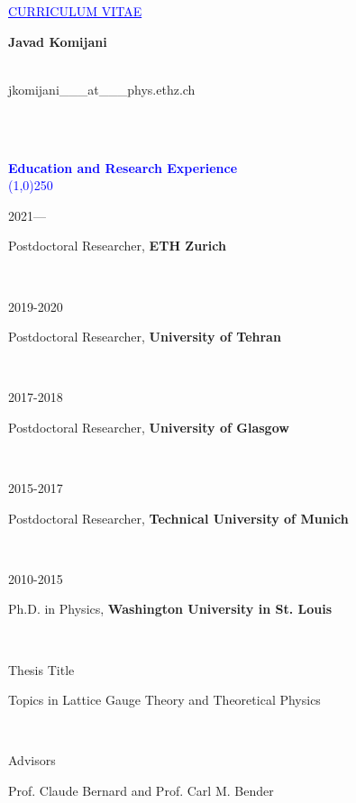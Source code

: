 \documentclass[a4paper,10pt]{article}
\newcommand{\miniLeft}[1]{\begin{minipage}[t]{0.15\textwidth} {#1} \end{minipage}}
\newcommand{\miniRight}[1]{\begin{minipage}[t]{0.85\textwidth} {#1} \end{minipage} \\}
\newcommand{\mini}[2]{\miniLeft{#1} \miniRight{#2}}
\newcommand{\Section}[1]{\linethickness{0.8mm} \textcolor{blue}{\\ {\textbf{#1}} \vspace{-3mm} \\  \line(1,0){250}} 
\\ }
\begin{document}

\vspace{-.1cm}
\par{\centering\textcolor{blue}{ \underline{CURRICULUM VITAE}\\}} %


\vspace{0.7cm} %


{\large \textbf{Javad Komijani}} \\

\vspace{-5mm}
\begin{minipage}[t]{0.40\textwidth} 
{\ }\\
{jkomijani\_\_\_at\_\_\_phys.ethz.ch}
\end{minipage}
\begin{minipage}[t]{0.60\textwidth} 
\begin{flushright}
{ }
\end{flushright}
\end{minipage} \\

\vspace{0.5cm} %

\Section{Education and Research Experience}

\mini{2021---}{{Postdoctoral Researcher}, \textbf{ETH Zurich}}

\mini{2019-2020}{{Postdoctoral Researcher}, \textbf{University of Tehran}}

\mini{2017-2018}{{Postdoctoral Researcher}, \textbf{University of Glasgow}}

\mini{2015-2017}{{Postdoctoral Researcher}, \textbf{Technical University of Munich}}

\mini{2010-2015}{{Ph.D. in Physics}, \textbf{Washington University in St. Louis}}
\mini{Thesis Title}{Topics in Lattice Gauge Theory and Theoretical Physics}
\mini{Advisors}{Prof. Claude Bernard and Prof. Carl M. Bender}
\end{document}

